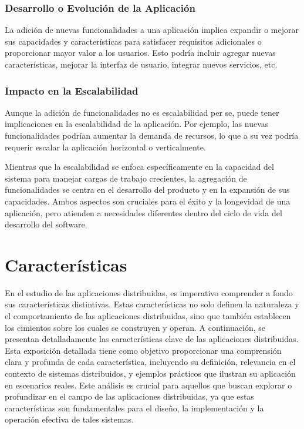 \subsubsection{Desarrollo o Evolución de la Aplicación}
La adición de nuevas funcionalidades a una aplicación implica expandir o mejorar sus capacidades y características para satisfacer requisitos adicionales o proporcionar mayor valor a los usuarios. Esto podría incluir agregar nuevas características, mejorar la interfaz de usuario, integrar nuevos servicios, etc.

\subsubsection{Impacto en la Escalabilidad}
Aunque la adición de funcionalidades no es escalabilidad per se, puede tener implicaciones en la escalabilidad de la aplicación. Por ejemplo, las nuevas funcionalidades podrían aumentar la demanda de recursos, lo que a su vez podría requerir escalar la aplicación horizontal o verticalmente.

\begin{tcolorbox}[colback=yellow!10!white, colframe=blue!50!black, title=Resumiendo, coltitle=white]
	Mientras que la escalabilidad se enfoca específicamente en la capacidad del sistema para manejar cargas de trabajo crecientes, la agregación de funcionalidades se centra en el desarrollo del producto y en la expansión de sus capacidades. Ambos aspectos son cruciales para el éxito y la longevidad de una aplicación, pero atienden a necesidades diferentes dentro del ciclo de vida del desarrollo del software.
\end{tcolorbox}

\section{Características}
En el estudio de las aplicaciones distribuidas, es imperativo comprender a fondo sus características distintivas. Estas características no solo definen la naturaleza y el comportamiento de las aplicaciones distribuidas, sino que también establecen los cimientos sobre los cuales se construyen y operan. A continuación, se presentan detalladamente las características clave de las aplicaciones distribuidas. Esta exposición detallada tiene como objetivo proporcionar una comprensión clara y profunda de cada característica, incluyendo su definición, relevancia en el contexto de sistemas distribuidos, y ejemplos prácticos que ilustran su aplicación en escenarios reales. Este análisis es crucial para aquellos que buscan explorar o profundizar en el campo de las aplicaciones distribuidas, ya que estas características son fundamentales para el diseño, la implementación y la operación efectiva de tales sistemas.

